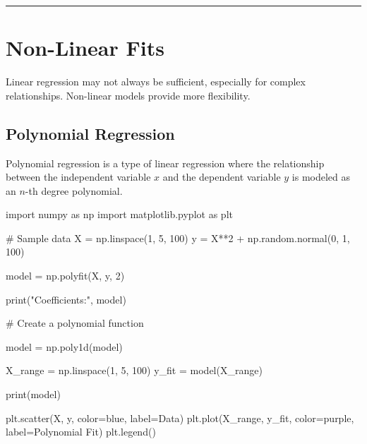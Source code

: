 \documentclass[
  letterpaper,
  DIV=11,
  numbers=noendperiod]{scrreprt}
\newenvironment{Shaded}{\begin{snugshade}}{\end{snugshade}}
\newcommand{\BuiltInTok}[1]{\textcolor[rgb]{0.00,0.23,0.31}{#1}}
\newcommand{\CommentTok}[1]{\textcolor[rgb]{0.37,0.37,0.37}{#1}}
\newcommand{\DecValTok}[1]{\textcolor[rgb]{0.68,0.00,0.00}{#1}}
\newcommand{\ImportTok}[1]{\textcolor[rgb]{0.00,0.46,0.62}{#1}}
\newcommand{\NormalTok}[1]{\textcolor[rgb]{0.00,0.23,0.31}{#1}}
\newcommand{\OperatorTok}[1]{\textcolor[rgb]{0.37,0.37,0.37}{#1}}
\newcommand{\StringTok}[1]{\textcolor[rgb]{0.13,0.47,0.30}{#1}}
\begin{document}
\begin{center}\rule{0.5\linewidth}{0.5pt}\end{center}

\section{Non-Linear Fits}\label{non-linear-fits}

Linear regression may not always be sufficient, especially for complex
relationships. Non-linear models provide more flexibility.

\subsection{Polynomial Regression}\label{polynomial-regression}

Polynomial regression is a type of linear regression where the
relationship between the independent variable \(x\) and the dependent
variable \(y\) is modeled as an \(n\)-th degree polynomial.

\begin{Shaded}
\begin{Highlighting}[]
\ImportTok{import}\NormalTok{ numpy }\ImportTok{as}\NormalTok{ np}
\ImportTok{import}\NormalTok{ matplotlib.pyplot }\ImportTok{as}\NormalTok{ plt}


\CommentTok{\# Sample data}
\NormalTok{X }\OperatorTok{=}\NormalTok{ np.linspace(}\DecValTok{1}\NormalTok{, }\DecValTok{5}\NormalTok{, }\DecValTok{100}\NormalTok{)}
\NormalTok{y }\OperatorTok{=}\NormalTok{ X}\OperatorTok{**}\DecValTok{2} \OperatorTok{+}\NormalTok{ np.random.normal(}\DecValTok{0}\NormalTok{, }\DecValTok{1}\NormalTok{, }\DecValTok{100}\NormalTok{)}

\NormalTok{model }\OperatorTok{=}\NormalTok{ np.polyfit(X, y, }\DecValTok{2}\NormalTok{)}

\BuiltInTok{print}\NormalTok{(}\StringTok{"Coefficients:"}\NormalTok{, model)}

\CommentTok{\# Create a polynomial function}

\NormalTok{model }\OperatorTok{=}\NormalTok{ np.poly1d(model)}

\NormalTok{X\_range }\OperatorTok{=}\NormalTok{ np.linspace(}\DecValTok{1}\NormalTok{, }\DecValTok{5}\NormalTok{, }\DecValTok{100}\NormalTok{)}
\NormalTok{y\_fit }\OperatorTok{=}\NormalTok{ model(X\_range)}

\BuiltInTok{print}\NormalTok{(model)}

\NormalTok{plt.scatter(X, y, color}\OperatorTok{=}\StringTok{\textquotesingle{}blue\textquotesingle{}}\NormalTok{, label}\OperatorTok{=}\StringTok{\textquotesingle{}Data\textquotesingle{}}\NormalTok{)}
\NormalTok{plt.plot(X\_range, y\_fit, color}\OperatorTok{=}\StringTok{\textquotesingle{}purple\textquotesingle{}}\NormalTok{, label}\OperatorTok{=}\StringTok{\textquotesingle{}Polynomial Fit\textquotesingle{}}\NormalTok{)}
\NormalTok{plt.legend()}
\end{Highlighting}
\end{Shaded}
\end{document}
